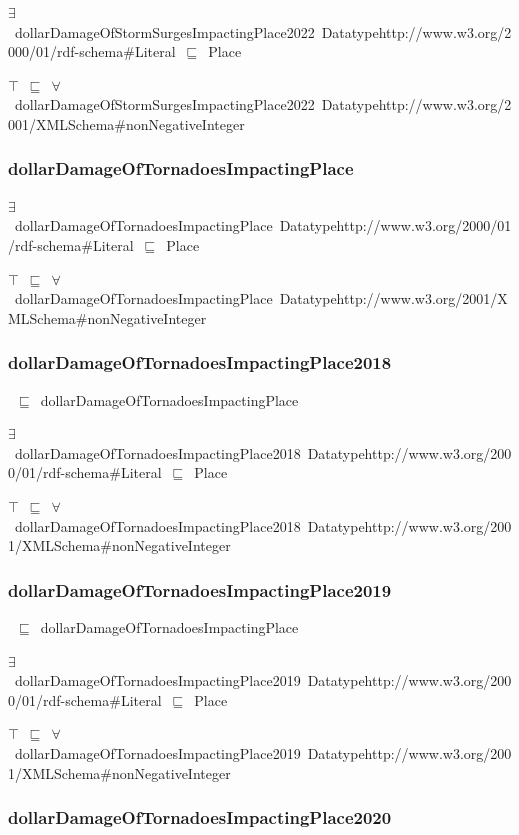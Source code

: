 \documentclass{article}
\begin{document}
\ensuremath{\exists}~dollarDamageOfStormSurgesImpactingPlace2022~Datatypehttp://www.w3.org/2000/01/rdf-schema#Literal~\ensuremath{\sqsubseteq}~Place

\ensuremath{\top}~\ensuremath{\sqsubseteq}~\ensuremath{\forall}~dollarDamageOfStormSurgesImpactingPlace2022~Datatypehttp://www.w3.org/2001/XMLSchema#nonNegativeInteger

\subsubsection*{dollarDamageOfTornadoesImpactingPlace}

\ensuremath{\exists}~dollarDamageOfTornadoesImpactingPlace~Datatypehttp://www.w3.org/2000/01/rdf-schema#Literal~\ensuremath{\sqsubseteq}~Place

\ensuremath{\top}~\ensuremath{\sqsubseteq}~\ensuremath{\forall}~dollarDamageOfTornadoesImpactingPlace~Datatypehttp://www.w3.org/2001/XMLSchema#nonNegativeInteger

\subsubsection*{dollarDamageOfTornadoesImpactingPlace2018}

~\ensuremath{\sqsubseteq}~dollarDamageOfTornadoesImpactingPlace

\ensuremath{\exists}~dollarDamageOfTornadoesImpactingPlace2018~Datatypehttp://www.w3.org/2000/01/rdf-schema#Literal~\ensuremath{\sqsubseteq}~Place

\ensuremath{\top}~\ensuremath{\sqsubseteq}~\ensuremath{\forall}~dollarDamageOfTornadoesImpactingPlace2018~Datatypehttp://www.w3.org/2001/XMLSchema#nonNegativeInteger

\subsubsection*{dollarDamageOfTornadoesImpactingPlace2019}

~\ensuremath{\sqsubseteq}~dollarDamageOfTornadoesImpactingPlace

\ensuremath{\exists}~dollarDamageOfTornadoesImpactingPlace2019~Datatypehttp://www.w3.org/2000/01/rdf-schema#Literal~\ensuremath{\sqsubseteq}~Place

\ensuremath{\top}~\ensuremath{\sqsubseteq}~\ensuremath{\forall}~dollarDamageOfTornadoesImpactingPlace2019~Datatypehttp://www.w3.org/2001/XMLSchema#nonNegativeInteger

\subsubsection*{dollarDamageOfTornadoesImpactingPlace2020}
\end{document}
